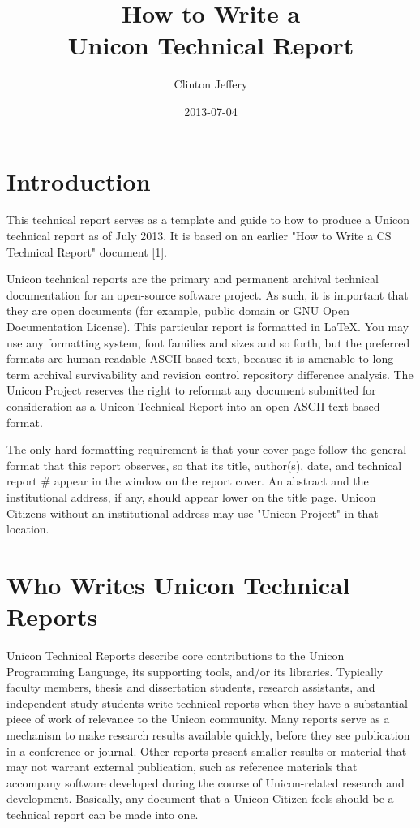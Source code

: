\documentclass[letterpaper,12pt]{article}
\title{How to Write a \\ Unicon Technical Report}
\author{Clinton Jeffery}
\date{2013-07-04}
\begin{document}
\maketitle

\section{Introduction}

This technical report serves as a template and guide to how to produce
a Unicon technical report as of July 2013. It is based on an earlier
"How to Write a CS Technical Report" document [1].

Unicon technical reports are the primary and permanent archival
technical documentation for an open-source software project. As such,
it is important that they are open documents (for example, public
domain or GNU Open Documentation License).  This particular report is
formatted in LaTeX. You may use any formatting system, font families
and sizes and so forth, but the preferred formats are human-readable
ASCII-based text, because it is amenable to long-term archival
survivability and revision control repository difference analysis. The
Unicon Project reserves the right to reformat any document submitted
for consideration as a Unicon Technical Report into an open ASCII
text-based format.

The only hard formatting requirement is that your cover page follow
the general format that this report observes, so that its title,
author(s), date, and technical report \# appear in the window on the
report cover. An abstract and the institutional address, if any,
should appear lower on the title page.  Unicon Citizens without an
institutional address may use "Unicon Project" in that location.

\section{Who Writes Unicon Technical Reports}

Unicon Technical Reports describe core contributions to the
Unicon Programming Language, its supporting tools, and/or its libraries.
Typically faculty members, thesis and dissertation students, research
assistants, and independent study students write technical reports
when they have a substantial piece of work of relevance to the Unicon
community.  Many reports serve as a mechanism to make research results
available quickly, before they see publication in a conference or
journal. Other reports present smaller results or material that may
not warrant external publication, such as reference materials that
accompany software developed during the course of Unicon-related
research and development. Basically, any document that a Unicon
Citizen feels should be a technical report can be made into one.
\end{document}
